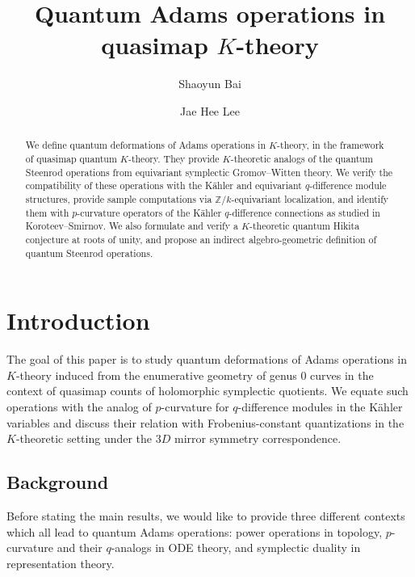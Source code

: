 \documentclass[reqno]{amsart}
\title{Quantum Adams operations in quasimap $K$-theory}
\author{Shaoyun Bai}
\author{Jae Hee Lee}
\numberwithin{equation}{section}
\numberwithin{equation}{section}
\numberwithin{equation}{section}
\theoremstyle{definition}
\theoremstyle{remark}
\theoremstyle{remark}
\begin{document}
\maketitle

\begin{abstract}
We define quantum deformations of Adams operations in $K$-theory, in the framework of quasimap quantum $K$-theory. They provide $K$-theoretic analogs of the quantum Steenrod operations from equivariant symplectic Gromov--Witten theory. We verify the compatibility of these operations with the K\"ahler and equivariant $q$-difference module structures, provide sample computations via $\mathbb{Z}/k$-equivariant localization, and identify them with $p$-curvature operators of the K\"ahler $q$-difference connections as studied in Koroteev--Smirnov. We also formulate and verify a $K$-theoretic quantum Hikita conjecture at roots of unity, and propose an indirect algebro-geometric definition of quantum Steenrod operations. 
\end{abstract}


\setcounter{tocdepth}{1}
\tableofcontents

\section{Introduction}\label{sec:intro}

The goal of this paper is to study quantum deformations of Adams operations in $K$-theory induced from the enumerative geometry of genus $0$ curves in the context of quasimap counts of holomorphic symplectic quotients. We equate such operations with the analog of $p$-curvature for $q$-difference modules in the K\"ahler variables and discuss their relation with Frobenius-constant quantizations in the $K$-theoretic setting under the $3D$ mirror symmetry correspondence.

\subsection{Background}
Before stating the main results, we would like to provide three different contexts which all lead to quantum Adams operations: power operations in topology, $p$-curvature and their $q$-analogs in ODE theory, and symplectic duality in representation theory.
\end{document}
